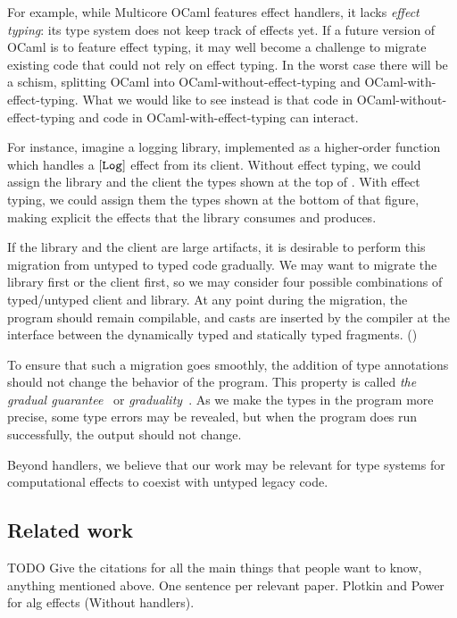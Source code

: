 For example,
while Multicore OCaml features effect handlers, it lacks \emph{effect typing}:
its type system does not keep track of effects yet.
If a future version of OCaml is to feature effect typing,
it may well become a challenge to migrate existing code that could
not rely on effect typing. In the worst case there will be a
schism, splitting OCaml into OCaml-without-effect-typing and
OCaml-with-effect-typing. What we would like to see instead
is that code in OCaml-without-effect-typing and
code in OCaml-with-effect-typing can interact.

For instance, imagine a logging library, implemented as a higher-order function
which handles a ${[\texttt{Log}]}$ effect from its client. Without effect typing, we could
assign the library and the client the types shown at the top of .
With effect typing, we could assign them the types shown at the bottom of that figure,
making explicit the effects that the library consumes and produces.

If the library and the client are large artifacts, it is desirable to
perform this migration from untyped to typed code gradually.
We may want to migrate the library first or the client first, so we
may consider four possible combinations of typed/untyped client and library.
At any point during the migration, the program should remain compilable, and
casts are inserted by the compiler at the interface between the dynamically
typed and statically typed fragments. ()

To ensure that such a migration goes smoothly, the addition of type annotations
should not change the behavior of the program. This property
is called \emph{the gradual guarantee}~\citep{siek2015} or \emph{graduality}~\citep{new-ahmed-2018}.
As we make the types in the program more precise, some type errors may be
revealed, but when the program does run successfully, the output
should not change.

Beyond handlers, we believe that our work may be relevant for
type systems for computational effects to coexist with untyped legacy code.

\subsection{Related work}

TODO Give the citations for all the main things that people want to know, anything mentioned above.
One sentence per relevant paper. Plotkin and Power for alg effects (Without handlers).

